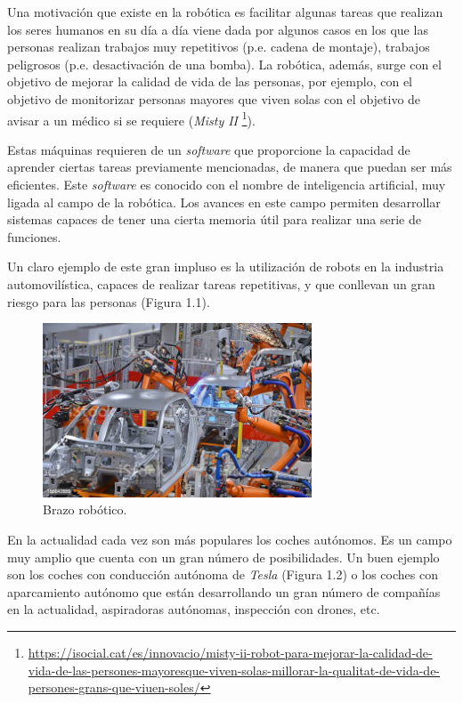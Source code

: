 \documentclass[a4paper, 12pt]{book}
\begin{document}
Una motivación que existe en la robótica es facilitar algunas tareas que realizan los seres humanos en su día a día viene dada por algunos casos en los que las personas realizan trabajos muy repetitivos (p.e. cadena de montaje), trabajos peligrosos (p.e. desactivación de una bomba). La robótica, además, surge con el objetivo de mejorar la calidad de vida de las personas, por ejemplo, con el objetivo de monitorizar personas mayores que viven solas con el objetivo de avisar a un médico si se requiere (\emph{Misty II} \footnote{\url{https://isocial.cat/es/innovacio/misty-ii-robot-para-mejorar-la-calidad-de-vida-de-las-persones-mayoresque-viven-solas-millorar-la-qualitat-de-vida-de-persones-grans-que-viuen-soles/}}).


Estas máquinas requieren de un \emph{software} que proporcione la capacidad de aprender ciertas tareas previamente mencionadas, de manera que puedan ser más eficientes. Este \emph{software} es conocido con el nombre de inteligencia artificial, muy ligada al campo de la robótica. Los avances en este campo permiten desarrollar sistemas capaces de tener una cierta memoria útil para realizar una serie de funciones.


Un claro ejemplo de este gran impluso es la utilización de robots en la industria automovilística, capaces de realizar tareas repetitivas, y que conllevan un gran riesgo para las personas (Figura 1.1).


\begin{figure}[H]
	\centering
    \includegraphics[width=8cm, keepaspectratio]{img/brazo}
    \caption{Brazo robótico.}
    \label{figura:brazo_robotico}
\end{figure}

En la actualidad cada vez son más populares los coches autónomos. Es un campo muy amplio que cuenta con un gran número de posibilidades. Un buen ejemplo son los coches con conducción autónoma de \textit{Tesla}  (Figura 1.2) o los coches con aparcamiento autónomo que están desarrollando un gran número de compañías en la actualidad, aspiradoras autónomas, inspección con drones, etc.
\end{document}
